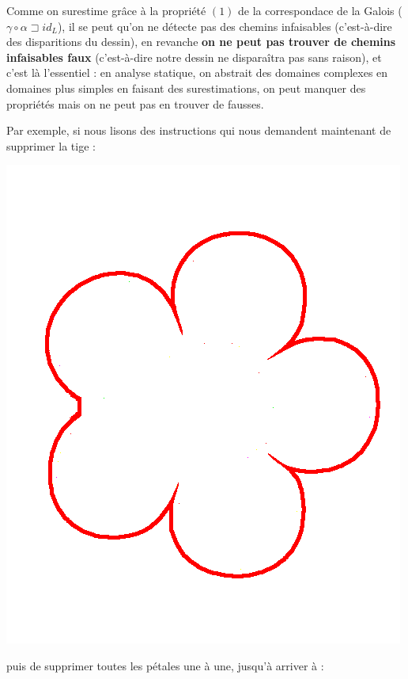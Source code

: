 \documentclass[french]{article}
\begin{document}
  Comme on surestime grâce à la propriété $(1)$ de la correspondace de la Galois ($\gamma \circ \alpha \sqsupset id_L$), il se peut qu'on ne détecte pas des chemins infaisables (c'est-à-dire des disparitions du dessin), en revanche \textbf{on ne peut pas trouver de chemins infaisables faux} (c'est-à-dire notre dessin ne disparaîtra pas sans raison), et c'est là l'essentiel : en analyse statique, on abstrait des domaines complexes en domaines plus simples en faisant des surestimations, on peut manquer des propriétés mais on ne peut pas en trouver de fausses.
  
  Par exemple, si nous lisons des instructions qui nous demandent maintenant de supprimer la tige :
  
  \begin{center}
    \includegraphics[scale=0.19]{./pictures/flower7.png}
  \end{center}
  
  puis de supprimer toutes les pétales une à une, jusqu'à arriver à :
  
\end{document}

